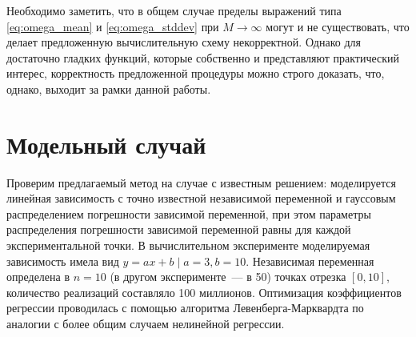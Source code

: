 \documentclass[11pt,a4paper]{article}
\theoremstyle{definition}
\begin{document}
Необходимо заметить, что в общем случае пределы выражений типа
\eqref{eq:omega_mean} и \eqref{eq:omega_stddev}
при $M \rightarrow \infty$ могут и не существовать, что делает предложенную
вычислительную схему некорректной. Однако для достаточно гладких
функций, которые собственно и представляют практический интерес,
корректность предложенной процедуры можно строго доказать, что, однако,
выходит за рамки данной работы.

\section{Модельный случай}

Проверим предлагаемый метод на случае с известным решением: моделируется
линейная зависимость с точно известной независимой переменной и гауссовым
распределением погрешности зависимой переменной, при этом параметры
распределения погрешности зависимой переменной равны для каждой
экспериментальной точки.
В вычислительном эксперименте моделируемая зависимость имела вид
$y = ax + b \mid a = 3, b = 10$. Независимая переменная
определена в $n = 10$ (в другом эксперименте~--- в 50) точках
отрезка $[0, 10]$, количество реализаций
составляло 100 миллионов. Оптимизация коэффициентов регрессии проводилась с помощью
алгоритма Левенберга-Марквардта по аналогии с более общим
случаем нелинейной регрессии.
\end{document}
